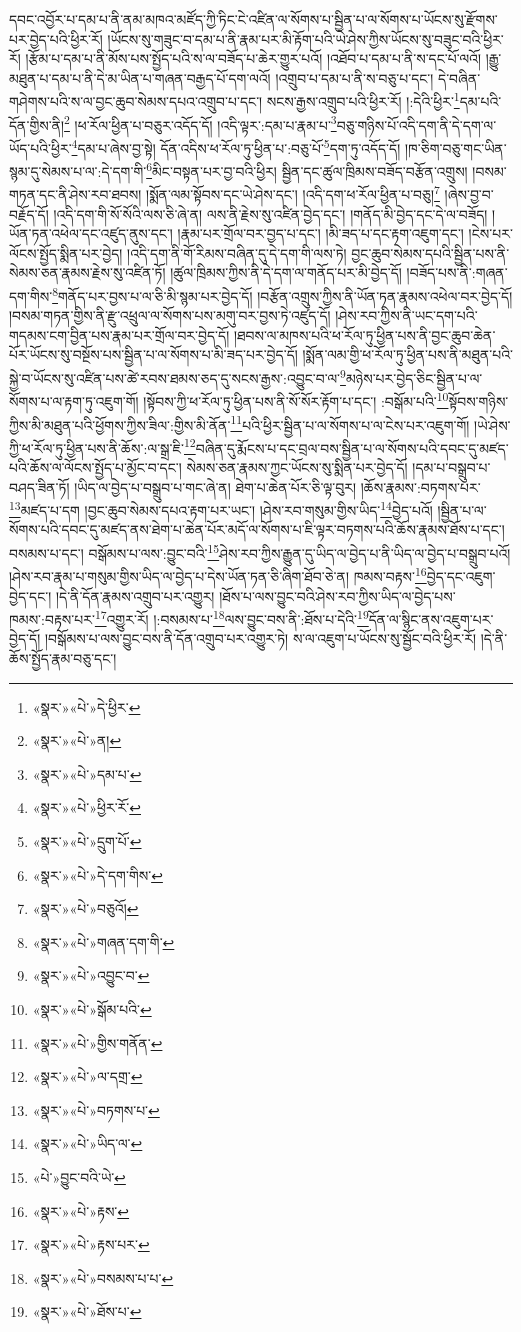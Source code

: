 དབང་འབྱོར་པ་དམ་པ་ནི་ནམ་མཁའ་མཛོད་ཀྱི་ཏིང་ངེ་འཛིན་ལ་སོགས་པ་སྦྱིན་པ་ལ་སོགས་པ་ཡོངས་སུ་རྫོགས་པར་བྱེད་པའི་ཕྱིར་རོ། །ཡོངས་སུ་གཟུང་བ་དམ་པ་ནི་རྣམ་པར་མི་རྟོག་པའི་ཡེ་ཤེས་ཀྱིས་ཡོངས་སུ་བཟུང་བའི་ཕྱིར་རོ། །རྩོམ་པ་དམ་པ་ནི་མོས་པས་སྤྱོད་པའི་ས་ལ་བཟོད་པ་ཆེར་གྱུར་པའོ། །འཐོབ་པ་དམ་པ་ནི་ས་དང་པོ་ལའོ། །རྒྱུ་མཐུན་པ་དམ་པ་ནི་དེ་མ་ཡིན་པ་གཞན་བརྒྱད་པོ་དག་ལའོ། །འགྲུབ་པ་དམ་པ་ནི་ས་བཅུ་པ་དང་། དེ་བཞིན་གཤེགས་པའི་ས་ལ་བྱང་ཆུབ་སེམས་དཔའ་འགྲུབ་པ་དང་། སངས་རྒྱས་འགྲུབ་པའི་ཕྱིར་རོ། །:དེའི་ཕྱིར་\footnote{«སྣར་»«པེ་»དེ་ཕྱིར་}དམ་པའི་དོན་གྱིས་ནི།\footnote{«སྣར་»«པེ་»ན།} །ཕ་རོལ་ཕྱིན་པ་བཅུར་འདོད་དོ། །འདི་ལྟར་:དམ་པ་རྣམ་པ་\footnote{«སྣར་»«པེ་»དམ་པ་}བཅུ་གཉིས་པོ་འདི་དག་ནི་དེ་དག་ལ་ཡོད་པའི་ཕྱིར་\footnote{«སྣར་»«པེ་»ཕྱིར་རོ་}དམ་པ་ཞེས་བྱ་སྟེ། དོན་འདིས་ཕ་རོལ་ཏུ་ཕྱིན་པ་:བཅུ་པོ་\footnote{«སྣར་»«པེ་»དྲུག་པོ་}དག་ཏུ་འདོད་དོ། །ཁ་ཅིག་བཅུ་གང་ཡིན་སྙམ་དུ་སེམས་པ་ལ་:དེ་དག་གི་\footnote{«སྣར་»«པེ་»དེ་དག་གིས་}མིང་བསྟན་པར་བྱ་བའི་ཕྱིར། སྦྱིན་དང་ཚུལ་ཁྲིམས་བཟོད་བརྩོན་འགྲུས། །བསམ་གཏན་དང་ནི་ཤེས་རབ་ཐབས། །སྨོན་ལམ་སྟོབས་དང་ཡེ་ཤེས་དང་། །འདི་དག་ཕ་རོལ་ཕྱིན་པ་བཅུ།\footnote{«སྣར་»«པེ་»བཅུའོ།} །ཞེས་བྱ་བ་བརྗོད་དོ། །འདི་དག་གི་སོ་སོའི་ལས་ཅི་ཞེ་ན། ལས་ནི་རྗེས་སུ་འཛིན་བྱེད་དང་། །གནོད་མི་བྱེད་དང་དེ་ལ་བཟོད། །ཡོན་ཏན་འཕེལ་དང་འཛུད་ནུས་དང་། །རྣམ་པར་གྲོལ་བར་བྱད་པ་དང་། །མི་ཟད་པ་དང་རྟག་འཇུག་དང་། །ངེས་པར་ལོངས་སྤྱོད་སྨིན་པར་བྱེད། །འདི་དག་ནི་གོ་རིམས་བཞིན་དུ་དེ་དག་གི་ལས་ཏེ། བྱང་ཆུབ་སེམས་དཔའི་སྦྱིན་པས་ནི་སེམས་ཅན་རྣམས་རྗེས་སུ་འཛིན་ཏོ། །ཚུལ་ཁྲིམས་ཀྱིས་ནི་དེ་དག་ལ་གནོད་པར་མི་བྱེད་དོ། །བཟོད་པས་ནི་:གཞན་དག་གིས་\footnote{«སྣར་»«པེ་»གཞན་དག་གི་}གནོད་པར་བྱས་པ་ལ་ཅི་མི་སྙམ་པར་བྱེད་དོ། །བརྩོན་འགྲུས་ཀྱིས་ནི་ཡོན་ཏན་རྣམས་འཕེལ་བར་བྱེད་དོ། །བསམ་གཏན་གྱིས་ནི་རྫུ་འཕྲུལ་ལ་སོགས་པས་མགུ་བར་བྱས་ཏེ་འཛུད་དོ། །ཤེས་རབ་ཀྱིས་ནི་ཡང་དག་པའི་གདམས་ངག་བྱིན་པས་རྣམ་པར་གྲོལ་བར་བྱེད་དོ། །ཐབས་ལ་མཁས་པའི་ཕ་རོལ་ཏུ་ཕྱིན་པས་ནི་བྱང་ཆུབ་ཆེན་པོར་ཡོངས་སུ་བསྔོས་པས་སྦྱིན་པ་ལ་སོགས་པ་མི་ཟད་པར་བྱེད་དོ། །སྨོན་ལམ་གྱི་ཕ་རོལ་ཏུ་ཕྱིན་པས་ནི་མཐུན་པའི་སྐྱེ་བ་ཡོངས་སུ་འཛིན་པས་ཚེ་རབས་ཐམས་ཅད་དུ་སངས་རྒྱས་:འབྱུང་བ་ལ་\footnote{«སྣར་»«པེ་»འབྱུང་བ་}མཉེས་པར་བྱེད་ཅིང་སྦྱིན་པ་ལ་སོགས་པ་ལ་རྟག་ཏུ་འཇུག་གོ། །སྟོབས་ཀྱི་ཕ་རོལ་ཏུ་ཕྱིན་པས་ནི་སོ་སོར་རྟོག་པ་དང་། :བསྒོམ་པའི་\footnote{«སྣར་»«པེ་»སྒོམ་པའི་}སྟོབས་གཉིས་ཀྱིས་མི་མཐུན་པའི་ཕྱོགས་ཀྱིས་ཟིལ་:གྱིས་མི་ནོན་\footnote{«སྣར་»«པེ་»གྱིས་གནོན་}པའི་ཕྱིར་སྦྱིན་པ་ལ་སོགས་པ་ལ་ངེས་པར་འཇུག་གོ། །ཡེ་ཤེས་ཀྱི་ཕ་རོལ་ཏུ་ཕྱིན་པས་ནི་ཆོས་:ལ་སྒྲ་ཇི་\footnote{«སྣར་»«པེ་»ལ་དགྲ་}བཞིན་དུ་རྨོངས་པ་དང་བྲལ་བས་སྦྱིན་པ་ལ་སོགས་པའི་དབང་དུ་མཛད་པའི་ཆོས་ལ་ལོངས་སྤྱོད་པ་མྱོང་བ་དང་། སེམས་ཅན་རྣམས་ཀྱང་ཡོངས་སུ་སྨིན་པར་བྱེད་དོ། །དམ་པ་བསྒྲུབ་པ་བཤད་ཟིན་ཏོ། །ཡིད་ལ་བྱེད་པ་བསྒྲུབ་པ་གང་ཞེ་ན། ཐེག་པ་ཆེན་པོར་ཅི་ལྟ་བུར། །ཆོས་རྣམས་:བཏགས་པར་\footnote{«སྣར་»«པེ་»བཏགས་པ་}མཛད་པ་དག །བྱང་ཆུབ་སེམས་དཔའ་རྟག་པར་ཡང་། །ཤེས་རབ་གསུམ་གྱིས་ཡིད་\footnote{«སྣར་»«པེ་»ཡིད་ལ་}བྱེད་པའོ། །སྦྱིན་པ་ལ་སོགས་པའི་དབང་དུ་མཛད་ནས་ཐེག་པ་ཆེན་པོར་མདོ་ལ་སོགས་པ་ཇི་ལྟར་བཏགས་པའི་ཆོས་རྣམས་ཐོས་པ་དང་། བསམས་པ་དང་། བསྒོམས་པ་ལས་:བྱུང་བའི་\footnote{«པེ་»བྱུང་བའི་ཡེ་}ཤེས་རབ་ཀྱིས་རྒྱུན་དུ་ཡིད་ལ་བྱེད་པ་ནི་ཡིད་ལ་བྱེད་པ་བསྒྲུབ་པའོ། །ཤེས་རབ་རྣམ་པ་གསུམ་གྱིས་ཡིད་ལ་བྱེད་པ་དེས་ཡོན་ཏན་ཅི་ཞིག་ཐོབ་ཅེ་ན། ཁམས་བརྟས་\footnote{«སྣར་»«པེ་»རྟས་}བྱེད་དང་འཇུག་བྱེད་དང་། །དེ་ནི་དོན་རྣམས་འགྲུབ་པར་འགྱུར། །ཐོས་པ་ལས་བྱུང་བའི་ཤེས་རབ་ཀྱིས་ཡིད་ལ་བྱེད་པས་ཁམས་:བརྟས་པར་\footnote{«སྣར་»«པེ་»རྟས་པར་}འགྱུར་རོ། །:བསམས་པ་\footnote{«སྣར་»«པེ་»བསམས་པ་པ་}ལས་བྱུང་བས་ནི་:ཐོས་པ་དེའི་\footnote{«སྣར་»«པེ་»ཐོས་པ་}དོན་ལ་སྙིང་ནས་འཇུག་པར་བྱེད་དོ། །བསྒོམས་པ་ལས་བྱུང་བས་ནི་དོན་འགྲུབ་པར་འགྱུར་ཏེ། ས་ལ་འཇུག་པ་ཡོངས་སུ་སྦྱོང་བའི་ཕྱིར་རོ། །དེ་ནི་ཆོས་སྤྱོད་རྣམ་བཅུ་དང་། 